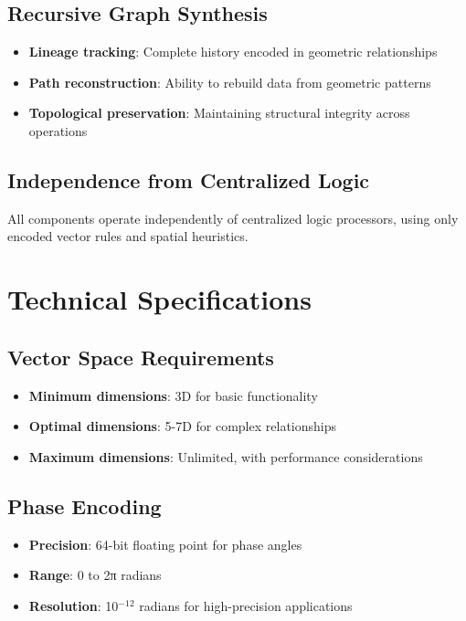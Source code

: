\documentclass[12pt,a4paper]{article}
\begin{document}
\subsection{Recursive Graph Synthesis}
\begin{itemize}
    \item \textbf{Lineage tracking}: Complete history encoded in geometric relationships
    \item \textbf{Path reconstruction}: Ability to rebuild data from geometric patterns
    \item \textbf{Topological preservation}: Maintaining structural integrity across operations
\end{itemize}

\subsection{Independence from Centralized Logic}
All components operate independently of centralized logic processors, using only encoded vector rules and spatial heuristics.

\section{Technical Specifications}

\subsection{Vector Space Requirements}
\begin{itemize}
    \item \textbf{Minimum dimensions}: 3D for basic functionality
    \item \textbf{Optimal dimensions}: 5-7D for complex relationships
    \item \textbf{Maximum dimensions}: Unlimited, with performance considerations
\end{itemize}

\subsection{Phase Encoding}
\begin{itemize}
    \item \textbf{Precision}: 64-bit floating point for phase angles
    \item \textbf{Range}: 0 to 2π radians
    \item \textbf{Resolution}: 10$^{-12}$ radians for high-precision applications
\end{itemize}
\end{document}
